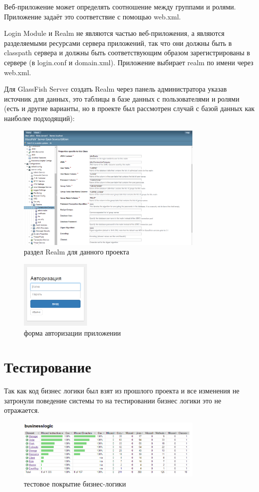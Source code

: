 Веб-приложение может определять соотношение между группами и ролями. Приложение задаёт это соответствие с помощью web.xml.

Login Module и Realm не являются частью веб-приложения, а являются разделяемыми ресурсами сервера приложений, так что они должны быть в classpath сервера и должны быть соответствующим образом зарегистрированы в сервере (в login.conf и domain.xml). Приложение выбирает realm по имени через web.xml. 

Для GlassFish Server создать Realm через панель администратора указав источник для данных, это таблицы в базе данных с пользователями и ролями (есть и другие варианты, но в проекте был рассмотрен случай с базой данных как наиболее подходящий):
\begin{figure}[!ht]
	\centering
	\includegraphics[width=0.8\textwidth]{img/security.png}
	\caption{раздел Realm для данного проекта}
\end{figure}
\begin{figure}[!ht]
	\centering
	\includegraphics[width=0.3\textwidth]{img/auth.png}
	\caption{форма авторизации приложении}
\end{figure}
\newpage
\section{Тестирование}
Так как код бизнес логики был взят из прошлого проекта и все изменения не затронули поведение системы то на тестировании бизнес логики это не отражается.
\begin{figure}[!ht]
	\centering
	\includegraphics[width=0.8\textwidth]{img/busnesslogicJUintTest.png}
	\caption{тестовое покрытие бизнес-логики}
\end{figure}

